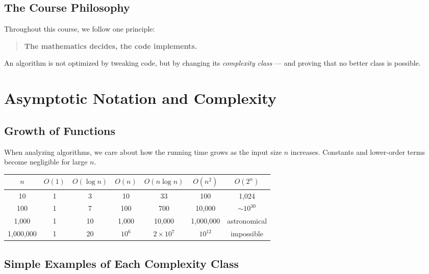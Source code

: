 \documentclass[11pt,a4paper]{article}
\begin{document}
\subsection{The Course Philosophy}

Throughout this course, we follow one principle:

\begin{quote}
\textbf{The mathematics decides, the code implements.}
\end{quote}

An algorithm is not optimized by tweaking code, but by changing its \emph{complexity class} --- and proving that no better class is possible.

\section{Asymptotic Notation and Complexity}

\subsection{Growth of Functions}

When analyzing algorithms, we care about how the running time grows as the input size $n$ increases. Constants and lower-order terms become negligible for large $n$.

\begin{center}
\begin{tabular}{c|cccccc}
\toprule
$n$ & $O(1)$ & $O(\log n)$ & $O(n)$ & $O(n \log n)$ & $O(n^2)$ & $O(2^n)$ \\
\midrule
10 & 1 & 3 & 10 & 33 & 100 & 1,024 \\
100 & 1 & 7 & 100 & 700 & 10,000 & $\sim 10^{30}$ \\
1,000 & 1 & 10 & 1,000 & 10,000 & 1,000,000 & astronomical \\
1,000,000 & 1 & 20 & $10^6$ & $2 \times 10^7$ & $10^{12}$ & impossible \\
\bottomrule
\end{tabular}
\end{center}

\subsection{Simple Examples of Each Complexity Class}
\end{document}
